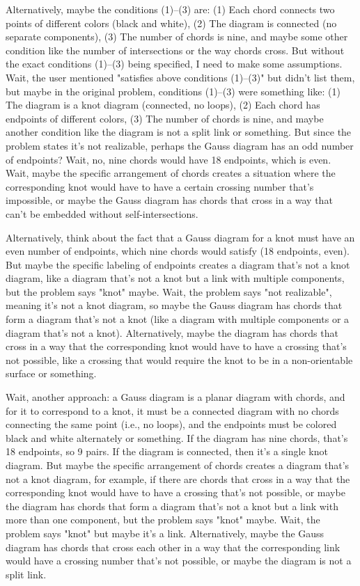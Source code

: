 Alternatively, maybe the conditions (1)--(3) are: (1) Each chord connects two points of different colors (black and white), (2) The diagram is connected (no separate components), (3) The number of chords is nine, and maybe some other condition like the number of intersections or the way chords cross. But without the exact conditions (1)--(3) being specified, I need to make some assumptions. Wait, the user mentioned "satisfies above conditions (1)--(3)" but didn't list them, but maybe in the original problem, conditions (1)--(3) were something like: (1) The diagram is a knot diagram (connected, no loops), (2) Each chord has endpoints of different colors, (3) The number of chords is nine, and maybe another condition like the diagram is not a split link or something. But since the problem states it's not realizable, perhaps the Gauss diagram has an odd number of endpoints? Wait, no, nine chords would have 18 endpoints, which is even. Wait, maybe the specific arrangement of chords creates a situation where the corresponding knot would have to have a certain crossing number that's impossible, or maybe the Gauss diagram has chords that cross in a way that can't be embedded without self-intersections.

Alternatively, think about the fact that a Gauss diagram for a knot must have an even number of endpoints, which nine chords would satisfy (18 endpoints, even). But maybe the specific labeling of endpoints creates a diagram that's not a knot diagram, like a diagram that's not a knot but a link with multiple components, but the problem says "knot" maybe. Wait, the problem says "not realizable", meaning it's not a knot diagram, so maybe the Gauss diagram has chords that form a diagram that's not a knot (like a diagram with multiple components or a diagram that's not a knot). Alternatively, maybe the diagram has chords that cross in a way that the corresponding knot would have to have a crossing that's not possible, like a crossing that would require the knot to be in a non-orientable surface or something.

Wait, another approach: a Gauss diagram is a planar diagram with chords, and for it to correspond to a knot, it must be a connected diagram with no chords connecting the same point (i.e., no loops), and the endpoints must be colored black and white alternately or something. If the diagram has nine chords, that's 18 endpoints, so 9 pairs. If the diagram is connected, then it's a single knot diagram. But maybe the specific arrangement of chords creates a diagram that's not a knot diagram, for example, if there are chords that cross in a way that the corresponding knot would have to have a crossing that's not possible, or maybe the diagram has chords that form a diagram that's not a knot but a link with more than one component, but the problem says "knot" maybe. Wait, the problem says "knot" but maybe it's a link. Alternatively, maybe the Gauss diagram has chords that cross each other in a way that the corresponding link would have a crossing number that's not possible, or maybe the diagram is not a split link.

